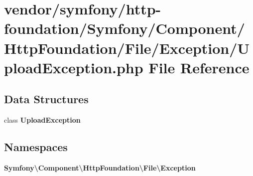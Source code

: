 \section{vendor/symfony/http-\/foundation/\+Symfony/\+Component/\+Http\+Foundation/\+File/\+Exception/\+Upload\+Exception.php File Reference}
\label{_upload_exception_8php}
\subsection*{Data Structures}
\begin{DoxyCompactItemize}
\item 
class {\bf Upload\+Exception}
\end{DoxyCompactItemize}
\subsection*{Namespaces}
\begin{DoxyCompactItemize}
\item 
 {\bf Symfony\textbackslash{}\+Component\textbackslash{}\+Http\+Foundation\textbackslash{}\+File\textbackslash{}\+Exception}
\end{DoxyCompactItemize}

